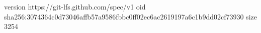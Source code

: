 version https://git-lfs.github.com/spec/v1
oid sha256:3074364c0d73046affb57a9586fbbc0ff02ec6ac2619197a6c1b9dd02cf73930
size 3254
